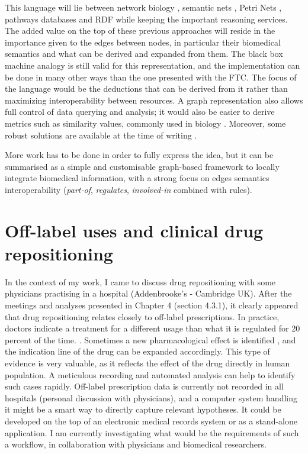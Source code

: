 This language will lie between network biology \citep{ravasz2002hierarchical}, semantic nets \citep{schubert1978structure}, Petri Nets \citep{murata1989petri}, pathways databases \citep{schaefer2009pid} and RDF while keeping the important reasoning services. The added value on the top of these previous approaches will reside in the importance given to the edges between nodes, in particular their biomedical semantics and what can be derived and expanded from them. The black box machine analogy is still valid for this representation, and the implementation can be done in many other ways than the one presented with the FTC. The focus of the language would be the deductions that can be derived from it rather than maximizing interoperability between resources. A graph representation also allows full control of data querying and analysis; it would also be easier to derive metrics such as similarity values, commonly used in biology \citep{stevens2007using}. Moreover, some robust solutions are available at the time of writing \citep{have2013graph}.

More work has to be done in order to fully express the idea, but it can be summarised as a simple and customisable graph-based framework to locally integrate biomedical information, with a strong focus on edges semantics interoperability (\emph{part-of}, \emph{regulates}, \emph{involved-in} combined with rules).

\section{Off-label uses and clinical drug repositioning}
In the context of my work, I came to discuss drug repositioning with some physicians practising in a hospital (Addenbrooke's - Cambridge UK). After the meetings and analyses presented in Chapter 4 (section 4.3.1), it clearly appeared that drug repositioning relates closely to off-label prescriptions. In practice, doctors indicate a treatment for a different usage than what it is regulated for 20 percent of the time. \citep{cras2007off}. Sometimes a new pharmacological effect is identified \citep{stephens2009dark}, and the indication line of the drug can be expanded accordingly. This type of evidence is very valuable, as it reflects the effect of the drug directly in human population. A meticulous recording and automated analysis can help to identify such cases rapidly. Off-label prescription data is currently not recorded in all hospitals (personal discussion with physicians), and a computer system handling it might be a smart way to directly capture relevant hypotheses. It could be developed on the top of an electronic medical records system \citep{cras2007off} or as a stand-alone application. I am currently investigating what would be the requirements of such a workflow, in collaboration with physicians and biomedical researchers.

